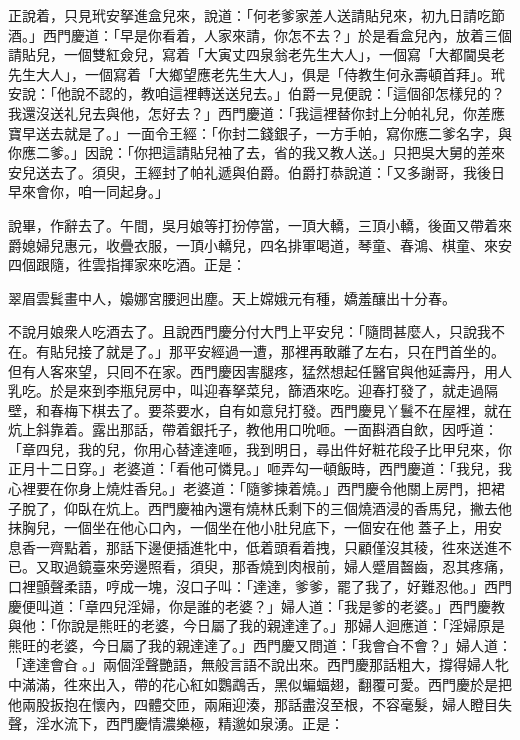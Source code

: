 正說着，只見玳安拏進盒兒來，說道：「何老爹家差人送請貼兒來，初九日請吃節酒。」西門慶道：「早是你看着，人家來請，你怎不去？」於是看盒兒內，放着三個請貼兒，一個雙紅僉兒，寫着「大寅丈四泉翁老先生大人」，一個寫「大都閫吳老先生大人」，一個寫着「大鄉望應老先生大人」，俱是「侍教生何永壽頓首拜」。玳安說：「他說不認的，教咱這裡轉送送兒去。」伯爵一見便說：「這個卻怎樣兒的？我還沒送礼兒去與他，怎好去？」西門慶道：「我這裡替你封上分帕礼兒，你差應寶早送去就是了。」一面令王經：「你封二錢銀子，一方手帕，寫你應二爹名字，與你應二爹。」因說：「你把這請貼兒袖了去，省的我又教人送。」只把吳大舅的差來安兒送去了。須臾，王經封了帕礼遞與伯爵。伯爵打恭說道：「又多謝哥，我後日早來會你，咱一同起身。」

說畢，作辭去了。午間，吳月娘等打扮停當，一頂大轎，三頂小轎，後面又帶着來爵媳婦兒惠元，收疊衣服，一頂小轎兒，四名排軍喝道，琴童、春鴻、棋童、來安四個跟隨，徃雲指揮家來吃酒。正是：

翠眉雲鬂畫中人，嬝娜宮腰迥出塵。天上嫦娥元有種，嬌羞釀出十分春。

不說月娘衆人吃酒去了。且說西門慶分付大門上平安兒：「隨問甚麼人，只說我不在。有貼兒接了就是了。」那平安經過一遭，那裡再敢離了左右，只在門首坐的。但有人客來望，只囘不在家。西門慶因害腿疼，猛然想起任醫官與他延壽丹，用人乳吃。{}於是來到李瓶兒房中，叫迎春拏菜兒，篩酒來吃。迎春打發了，就走過隔壁，和春梅下棋去了。要茶要水，自有如意兒打發。西門慶見丫鬟不在屋裡，就在炕上斜靠着。露出那話，帶着銀托子，教他用口吮咂。一面斟酒自飲，因呼道：「章四兒，我的兒，你用心替達達咂，我到明日，尋出件好粧花段子比甲兒來，你正月十二日穿。」老婆道：「看他可憐見。」咂弄勾一頓飯時，西門慶道：「我兒，我心裡要在你身上燒炷香兒。」老婆道：「隨爹揀着燒。」西門慶令他關上房門，把裙子脫了，仰臥在炕上。西門慶袖內還有燒林氏剩下的三個燒酒浸的香馬兒，撇去他抹胸兒，一個坐在他心口內，一個坐在他小肚兒底下，一個安在他𣭈蓋子上，用安息香一齊點着，那話下邊便插進牝中，低着頭看着拽，只顧僅沒其稜，徃來送進不已。又取過鏡臺來旁邊照看，{}須臾，那香燒到肉根前，婦人蹙眉齧齒，忍其疼痛，口裡顫聲柔語，哼成一塊，沒口子叫：「達達，爹爹，罷了我了，好難忍他。」西門慶便叫道：「章四兒淫婦，你是誰的老婆？」婦人道：「我是爹的老婆。」西門慶教與他：「你說是熊旺的老婆，今日屬了我的親達達了。」{}那婦人迴應道：「淫婦原是熊旺的老婆，今日屬了我的親達達了。」西門慶又問道：「我會㒲不會？」婦人道：「達達會㒲𣭈。」兩個淫聲艷語，無般言語不說出來。西門慶那話粗大，撐得婦人牝中滿滿，徃來出入，帶的花心紅如鸚鵡舌，黑似蝙蝠翅，翻覆可愛。西門慶於是把他兩股扳抱在懷內，四體交匝，兩廂迎湊，那話盡沒至根，不容毫髮，婦人瞪目失聲，淫水流下，西門慶情濃樂極，精邈如泉湧。正是：

